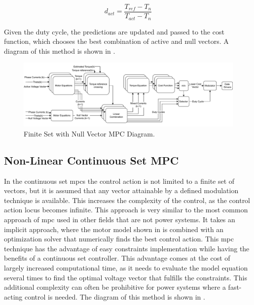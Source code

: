 \begin{equation}
	d_{act} = \frac{T_{ref} - T_n}{T_{act}-T_n}
	\label{eq:duty_cycle}
\end{equation}


Given the duty cycle, the predictions are updated and passed to the cost function, which chooses the best combination of active and null vectors. A diagram of this method is shown in .

\begin{figure}[!htb]
	\centering
	\includegraphics[width=1\textwidth]{Figures/FSMPC_null_vector.pdf}
	\caption[Finite Set with Null Vector MPC Diagram.]{Finite Set with Null Vector MPC Diagram.}
	\label{fig:FSMPC_null_Diagram}%
\end{figure}

\subsection{Non-Linear Continuous Set MPC}

In the continuous set \glspl{mpc} the control action is not limited to a finite set of vectors, but it is assumed that any vector attainable by a defined modulation technique is available. This increases the complexity of the control, as the control action locus becomes infinite.
 This approach is very similar to the most common approach of \gls{mpc} used in other fields that are not power systems. It takes an implicit approach, where the motor model shown in  is combined with an optimization solver that numerically finds the best control action. This \gls{mpc} technique has the advantage of easy constraints implementation while having the benefits of a continuous set controller. This advantage comes at the cost of largely increased computational time, as it needs to evaluate the model equation several times to find the optimal voltage vector that fulfills the constraints. This additional complexity can often be prohibitive for power systems where a fast-acting control is needed. The diagram of this method is shown in .

